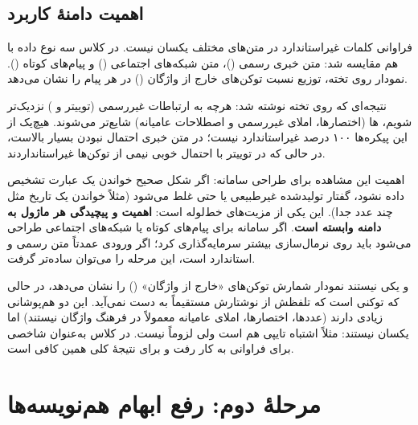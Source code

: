 \subsection{اهمیت دامنهٔ کاربرد}
فراوانی کلمات غیراستاندارد در متن‌های مختلف یکسان نیست. در کلاس سه نوع داده با هم مقایسه شد: متن خبری رسمی ()، متن شبکه‌های اجتماعی () و پیام‌های کوتاه (). نمودار روی تخته، توزیع نسبت توکن‌های خارج از واژگان () در هر پیام را نشان می‌دهد.


نتیجه‌ای که روی تخته نوشته شد: هرچه به ارتباطات غیررسمی (توییتر و ) نزدیک‌تر شویم، ها (اختصارها، املای غیررسمی و اصطلاحات عامیانه) شایع‌تر می‌شوند. هیچ‌یک از این پیکره‌ها ۱۰۰ درصد غیراستاندارد نیست؛ در متن خبری احتمال نبودن  بسیار بالاست، در حالی که در توییتر با احتمال خوبی نیمی از توکن‌ها غیراستانداردند.

اهمیت این مشاهده برای طراحی سامانه: اگر شکل صحیح خواندن یک عبارت تشخیص داده نشود، گفتار تولیدشده غیرطبیعی یا حتی غلط می‌شود (مثلاً خواندن یک تاریخ مثل چند عدد جدا). این یکی از مزیت‌های خط‌لوله است: \textbf{اهمیت و پیچیدگی هر ماژول به دامنه وابسته است}. اگر سامانه برای پیام‌های کوتاه یا شبکه‌های اجتماعی طراحی می‌شود باید روی نرمال‌سازی بیشتر سرمایه‌گذاری کرد؛ اگر ورودی عمدتاً متن رسمی و استاندارد است، این مرحله را می‌توان ساده‌تر گرفت.

\begin{correctionbox}{ و  یکی نیستند}
نمودار شمارش توکن‌های «خارج از واژگان» () را نشان می‌دهد، در حالی که  توکنی است که تلفظش از نوشتارش مستقیماً به دست نمی‌آید. این دو هم‌پوشانی زیادی دارند (عددها، اختصارها، املای عامیانه معمولاً در فرهنگ واژگان نیستند) اما یکسان نیستند: مثلاً اشتباه تایپی هم  است ولی لزوماً  نیست. در کلاس  به‌عنوان شاخصی برای فراوانی  به کار رفت و برای نتیجهٔ کلی همین کافی است.
\end{correctionbox}

\section{مرحلهٔ دوم: رفع ابهام هم‌نویسه‌ها}

